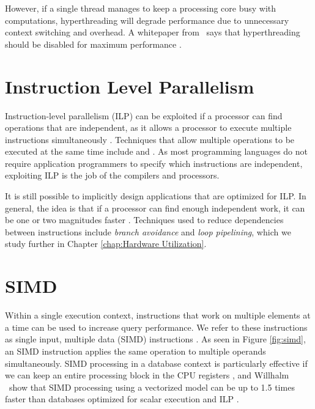 However, if a single thread manages to keep a processing core busy with computations, hyperthreading will degrade performance due to unnecessary context switching and overhead. A whitepaper from \qlikview~says that hyperthreading should be disabled for maximum performance \cite{Qlik2011-yc}.

\section{Instruction Level Parallelism}
\label{sec:Instruction Level Parallelism}

Instruction-level parallelism (ILP) can be exploited if a processor can find operations that are independent, as it allows a processor to execute multiple instructions simultaneously \cite{Wikipedia_contributors2015-vg}. Techniques that allow multiple operations to be executed at the same time include  and . As most programming languages do not require application programmers to specify which instructions are independent, exploiting ILP is the job of the compilers and processors.

It is still possible to implicitly design applications that are optimized for ILP. In general, the idea is that if a processor can find enough independent work, it can be one or two magnitudes faster \cite{Boncz2005-wj}. Techniques used to reduce dependencies between instructions include \textit{branch avoidance} and \textit{loop pipelining}, which we study further in Chapter \ref{chap:Hardware Utilization}.

\section{SIMD}
\label{sec:SIMD}
Within a single execution context, instructions that work on multiple elements at a time can be used to increase query performance. We refer to these instructions as single input, multiple data (SIMD) instructions \cite{Wikipedia_contributors2015-ax}. As seen in Figure \ref{fig:simd}, an SIMD instruction applies the same operation to multiple operands simultaneously. SIMD processing in a database context is particularly effective if we can keep an entire processing block in the CPU registers \cite{Neumann2011-uq}, and Willhalm \ea~show that SIMD processing using a vectorized model can be up to 1.5 times faster than databases optimized for scalar execution and ILP \cite{Willhalm2009-hu}.


